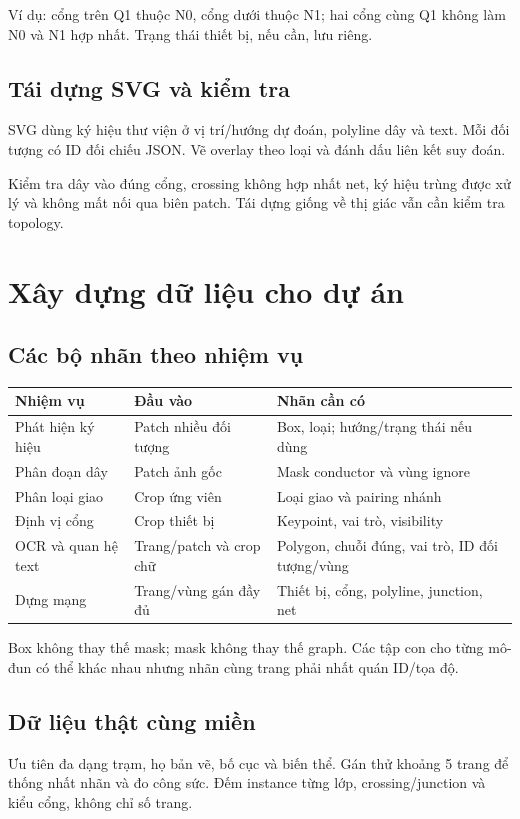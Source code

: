 \documentclass[11pt,a4paper]{article}
\begin{document}
Ví dụ: cổng trên Q1 thuộc N0, cổng dưới thuộc N1; hai cổng cùng Q1 không làm N0 và N1 hợp nhất. Trạng thái thiết bị, nếu cần, lưu riêng.

\subsection{Tái dựng SVG và kiểm tra}
SVG dùng ký hiệu thư viện ở vị trí/hướng dự đoán, polyline dây và text. Mỗi đối tượng có ID đối chiếu JSON. Vẽ overlay theo loại và đánh dấu liên kết suy đoán.

Kiểm tra dây vào đúng cổng, crossing không hợp nhất net, ký hiệu trùng được xử lý và không mất nối qua biên patch. Tái dựng giống về thị giác vẫn cần kiểm tra topology.

\section{Xây dựng dữ liệu cho dự án}
\subsection{Các bộ nhãn theo nhiệm vụ}
\begin{center}
\small
\begin{tabularx}{\linewidth}{L{2.5cm}YY}
\toprule
Nhiệm vụ & Đầu vào & Nhãn cần có\\
\midrule
Phát hiện ký hiệu & Patch nhiều đối tượng & Box, loại; hướng/trạng thái nếu dùng\\
Phân đoạn dây & Patch ảnh gốc & Mask conductor và vùng ignore\\
Phân loại giao & Crop ứng viên & Loại giao và pairing nhánh\\
Định vị cổng & Crop thiết bị & Keypoint, vai trò, visibility\\
OCR và quan hệ text & Trang/patch và crop chữ & Polygon, chuỗi đúng, vai trò, ID đối tượng/vùng\\
Dựng mạng & Trang/vùng gán đầy đủ & Thiết bị, cổng, polyline, junction, net\\
\bottomrule
\end{tabularx}
\end{center}
Box không thay thế mask; mask không thay thế graph. Các tập con cho từng mô-đun có thể khác nhau nhưng nhãn cùng trang phải nhất quán ID/tọa độ.

\subsection{Dữ liệu thật cùng miền}
Ưu tiên đa dạng trạm, họ bản vẽ, bố cục và biến thể. Gán thử khoảng 5 trang để thống nhất nhãn và đo công sức. Đếm instance từng lớp, crossing/junction và kiểu cổng, không chỉ số trang.
\end{document}
